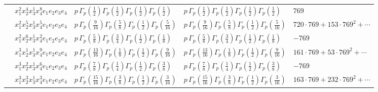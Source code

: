 \documentclass[11pt]{article}
\begin{document}
\begin{table}[ht]
{\begin{tabular}{@{}lllll@{}}
 & $x_{1}^{2} x_{2}^{4} x_{3}^{1} x_{4}^{8}  e_{1} e_{2} e_{3} e_{4}$ & $p \, \Gamma_p \left( \frac{1}{2} \right) \Gamma_p \left( \frac{1}{2} \right) \Gamma_p \left( \frac{1}{2} \right) \Gamma_p \left( \frac{1}{2} \right)$ & $p \, \Gamma_p \left( \frac{1}{2} \right) \Gamma_p \left( \frac{1}{2} \right) \Gamma_p \left( \frac{1}{2} \right) \Gamma_p \left( \frac{1}{2} \right)$ & $769$ \\
 & $x_{1}^{2} x_{2}^{5} x_{3}^{1} x_{4}^{5}  e_{1} e_{2} e_{3} e_{4}$ & $p \, \Gamma_p \left( \frac{9}{16} \right) \Gamma_p \left( \frac{5}{8} \right) \Gamma_p \left( \frac{1}{2} \right) \Gamma_p \left( \frac{5}{16} \right)$ & $p \, \Gamma_p \left( \frac{9}{16} \right) \Gamma_p \left( \frac{5}{8} \right) \Gamma_p \left( \frac{1}{2} \right) \Gamma_p \left( \frac{5}{16} \right)$ & $720{\cdot}769{+}153{\cdot}769^{2}{+}\cdots$ \\
 & $x_{1}^{2} x_{2}^{6} x_{3}^{1} x_{4}^{2}  e_{1} e_{2} e_{3} e_{4}$ & $p \, \Gamma_p \left( \frac{5}{8} \right) \Gamma_p \left( \frac{3}{4} \right) \Gamma_p \left( \frac{1}{2} \right) \Gamma_p \left( \frac{1}{8} \right)$ & $p \, \Gamma_p \left( \frac{5}{8} \right) \Gamma_p \left( \frac{3}{4} \right) \Gamma_p \left( \frac{1}{2} \right) \Gamma_p \left( \frac{1}{8} \right)$ & $-769$ \\
 & $x_{1}^{3} x_{2}^{1} x_{3}^{1} x_{4}^{9}  e_{1} e_{2} e_{3} e_{4}$ & $p \, \Gamma_p \left( \frac{13}{16} \right) \Gamma_p \left( \frac{1}{8} \right) \Gamma_p \left( \frac{1}{2} \right) \Gamma_p \left( \frac{9}{16} \right)$ & $p \, \Gamma_p \left( \frac{13}{16} \right) \Gamma_p \left( \frac{1}{8} \right) \Gamma_p \left( \frac{1}{2} \right) \Gamma_p \left( \frac{9}{16} \right)$ & $161{\cdot}769{+}53{\cdot}769^{2}{+}\cdots$ \\
 & $x_{1}^{3} x_{2}^{2} x_{3}^{1} x_{4}^{6}  e_{1} e_{2} e_{3} e_{4}$ & $p \, \Gamma_p \left( \frac{7}{8} \right) \Gamma_p \left( \frac{1}{4} \right) \Gamma_p \left( \frac{1}{2} \right) \Gamma_p \left( \frac{3}{8} \right)$ & $p \, \Gamma_p \left( \frac{7}{8} \right) \Gamma_p \left( \frac{1}{4} \right) \Gamma_p \left( \frac{1}{2} \right) \Gamma_p \left( \frac{3}{8} \right)$ & $-769$ \\
 & $x_{1}^{3} x_{2}^{3} x_{3}^{1} x_{4}^{3}  e_{1} e_{2} e_{3} e_{4}$ & $p \, \Gamma_p \left( \frac{15}{16} \right) \Gamma_p \left( \frac{3}{8} \right) \Gamma_p \left( \frac{1}{2} \right) \Gamma_p \left( \frac{3}{16} \right)$ & $p \, \Gamma_p \left( \frac{15}{16} \right) \Gamma_p \left( \frac{3}{8} \right) \Gamma_p \left( \frac{1}{2} \right) \Gamma_p \left( \frac{3}{16} \right)$ & $163{\cdot}769{+}232{\cdot}769^{2}{+}\cdots$ \\

\end{tabular}}
\end{table}
\end{document}
